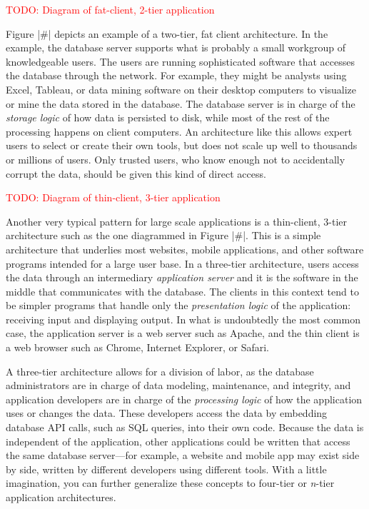 \documentclass[11pt]{book}
\newcommand{\term}[1]{\emph{#1}} %
\newcommand{\todo}[1]{\textcolor{red}{TODO: #1}} %
\begin{document}
\todo{Diagram of fat-client, 2-tier application}

Figure |#| depicts an example of a two-tier, fat client architecture.  In the example, the database server supports what is probably a small workgroup of knowledgeable users.  The users are running sophisticated software that accesses the database through the network.  For example, they might be analysts using Excel, Tableau, or data mining software on their desktop computers to visualize or mine the data stored in the database.  The database server is in charge of the \term{storage logic} of how data is persisted to disk, while most of the rest of the processing happens on client computers.  An architecture like this allows expert users to select or create their own tools, but does not scale up well to thousands or millions of users.  Only trusted users, who know enough not to accidentally corrupt the data, should be given this kind of direct access.

\todo{Diagram of thin-client, 3-tier application}

Another very typical pattern for large scale applications is a thin-client, 3-tier architecture such as the one diagrammed in Figure |#|.  This is a simple architecture that underlies most websites, mobile applications, and other software programs intended for a large user base.  In a three-tier architecture, users access the data through an intermediary \term{application server} and it is the software in the middle that communicates with the database.  The clients in this context tend to be simpler programs that handle only the \term{presentation logic} of the application: receiving input and displaying output.  In what is undoubtedly the most common case, the application server is a web server such as Apache, and the thin client is a web browser such as Chrome, Internet Explorer, or Safari.

A three-tier architecture allows for a division of labor, as the database administrators are in charge of data modeling, maintenance, and integrity, and application developers are in charge of the \term{processing logic} of how the application uses or changes the data.  These developers access the data by embedding database API calls, such as SQL queries, into their own code.  Because the data is independent of the application, other applications could be written that access the same database server---for example, a website and mobile app may exist side by side, written by different developers using different tools.  With a little imagination, you can further generalize these concepts to four-tier or \emph{n}-tier application architectures.
\end{document}
